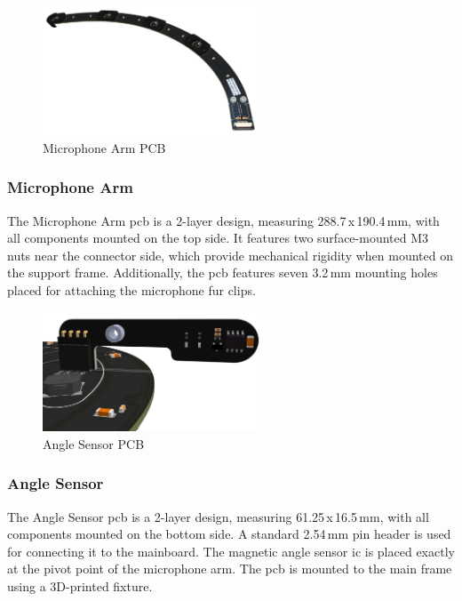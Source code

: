 \begin{minipage}{\linewidth}
	\begin{figure}
		\vspace{0.2cm}
		\includegraphics[width=6.5cm]{images/6_design_final/Microphone_Arm_Front.png}
		\centering
		\caption{Microphone Arm PCB}
		\label{fig:microphone_arm_pcb}
	\end{figure}
	\subsubsection{Microphone Arm}
	The Microphone Arm \acrshort{pcb} is a 2-layer design, measuring 288.7\,x\,190.4\,mm, with all components mounted on the top side.
	It features two surface-mounted M3 nuts near the connector side, which provide mechanical rigidity when mounted on the support frame.
	Additionally, the \acrshort{pcb} features seven 3.2\,mm mounting holes placed for attaching the microphone fur clips.
\end{minipage}

\begin{minipage}{\linewidth}
	\begin{figure}
		\vspace{0.2cm}
		\includegraphics[width=6.5cm]{images/6_design_final/Angle_Sensor_Front.png}
		\centering
		\caption{Angle Sensor PCB}
		\label{fig:angle_sensor_pcb}
	\end{figure}
	\subsubsection{Angle Sensor}
	The Angle Sensor \acrshort{pcb} is a 2-layer design, measuring 61.25\,x\,16.5\,mm, with all components mounted on the bottom side.
	A standard 2.54\,mm pin header is used for connecting it to the mainboard.
	The magnetic angle sensor \acrshort{ic} is placed exactly at the pivot point of the microphone arm.
	The \acrshort{pcb} is mounted to the main frame using a 3D-printed fixture.
\end{minipage}

